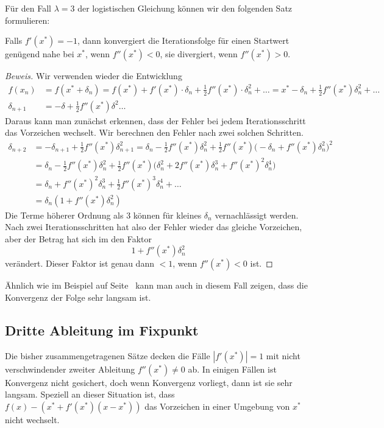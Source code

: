 Für den Fall $\lambda=3$ der logistischen Gleichung können wir den
folgenden Satz formulieren:

\begin{satz}
Falls $f'(x^*)=-1$, dann konvergiert die Iterationsfolge für einen
Startwert genügend nahe bei $x^*$, wenn $f''(x^*) <0$, sie divergiert,
wenn $f''(x^*)>0$.
\end{satz}

\begin{proof}[Beweis]
Wir verwenden wieder die Entwicklung
\begin{align*}
f(x_n)
&=
f(x^* +\delta_n)
=
f(x^*) + f'(x^*) \cdot \delta_n + \frac12 f''(x^*)\cdot \delta_n^2
+ \dots
=
x^* - \delta_n + \frac12f''(x^*)\delta_n^2 +\dots
\\
\delta_{n+1}
&=
-\delta + \frac12f''(x^*)\delta^2 \dots
\end{align*}
Daraus kann man zunächst erkennen, dass der Fehler bei jedem 
Iterationsschritt das Vorzeichen wechselt.
Wir berechnen den Fehler nach zwei solchen Schritten.
\begin{align*}
\delta_{n+2}
&=
-\delta_{n+1} + \frac12f''(x^*) \delta_{n+1}^2
=
\delta_n - \frac12f''(x^*) \delta_n^2
+
\frac12 f''(x^*) \bigl(-\delta_n + f''(x^*)\delta_n^2\bigr)^2
\\
&=
\delta_n 
-\frac12 f''(x^*)
\delta_n^2
+\frac12 f''(x^*)
\bigl( \delta_n^2 + 2f''(x^*)\delta_n^3 + f''(x^*)^2\delta_n^4\bigr)
\\
&=
\delta_n
+
f''(x^*)^2\delta_n^3
+
\frac12f''(x^*)^3\delta_n^4
+\dots
\\
&=
\delta_n (1 + f''(x^*)\delta_n^2)
\end{align*}
Die Terme höherer Ordnung als $3$ können für kleines $\delta_n$ 
vernachlässigt werden.
Nach zwei Iterationsschritten hat also der Fehler wieder das gleiche
Vorzeichen, aber der Betrag hat sich im den Faktor
\[
1+f''(x^*)\delta_n^2
\]
verändert.
Dieser Faktor ist genau dann $<1$, wenn $f''(x^*)<0$ ist.
\end{proof}

Ähnlich wie im Beispiel auf 
Seite~\pageref{buch:beispiel:logistisch3} kann man auch in diesem
Fall zeigen, dass die Konvergenz der Folge sehr langsam ist.

%
%
\subsection{Dritte Ableitung im Fixpunkt
\label{buch:subsection:dritteableitungfixpunkt}}
Die bisher zusammengetragenen Sätze decken die Fälle $|f'(x^*)|=1$ mit
nicht verschwindender zweiter Ableitung $f''(x^*)\ne 0$ ab.
In einigen Fällen ist Konvergenz nicht gesichert, doch wenn Konvergenz
vorliegt, dann ist sie sehr langsam.
Speziell an dieser Situation ist, dass
$f(x)-(x^* + f'(x^*)(x-x^*))$
das Vorzeichen in einer Umgebung von $x^*$ nicht wechselt.


